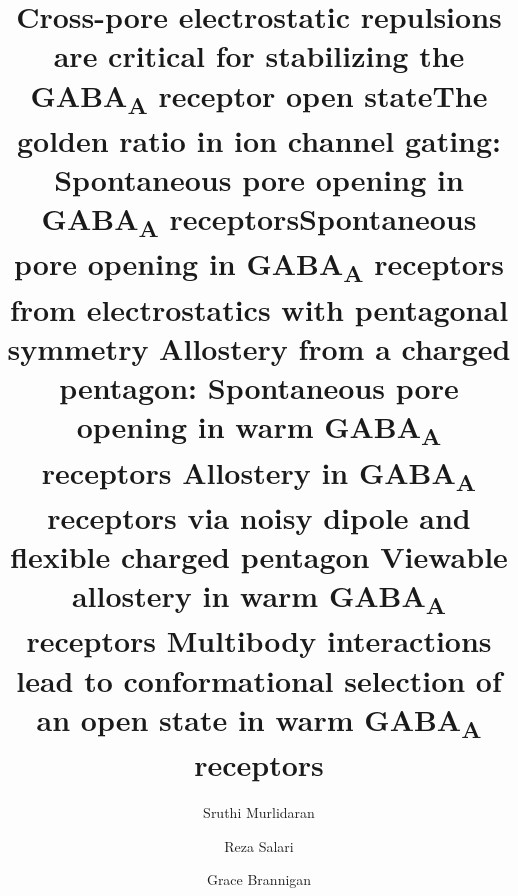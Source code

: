 \documentclass[9pt,twocolumn,twoside,lineno]{pnas-new}
\begin{document}
\title{Cross-pore electrostatic repulsions are critical for stabilizing the GABA\textsubscript{A} receptor open state}
\title{The golden ratio in ion channel gating: Spontaneous pore opening in GABA\textsubscript{A} receptors}
\title{Spontaneous pore opening in GABA\textsubscript{A} receptors from electrostatics with pentagonal symmetry }
\title{Allostery from a charged pentagon: Spontaneous pore opening in warm GABA\textsubscript{A} receptors  }
\title{Allostery in GABA\textsubscript{A} receptors via noisy dipole and flexible charged pentagon  }
\title{Viewable allostery in warm GABA\textsubscript{A} receptors }
\title{Multibody interactions lead to conformational selection of an open state in warm GABA\textsubscript{A} receptors }
\author[a,1]{Sruthi Murlidaran}
\author[a,b,2]{Reza Salari}
\author[a,b,3]{Grace Brannigan}


\newcommand{\SFullABF}{S14}
\newcommand{\sfigAlignment}{S3}
\newcommand{\sfigDeltaPhiDist}{S2}
\newcommand{\SklowTrepTwo}{S6}
\newcommand{\SkMovie}{S1}
\newcommand{\sFigEnergy}{S1}
\newcommand{\sFigReplicas}{S5-S11}
\newcommand{\grace}[1]{\textcolor{blue}{#1}}
\newcommand{\GABAA}{GABA\textsubscript{A}R\xspace}
\newcommand{\avgr}{\bar{r}}
\newcommand{\varr}{\delta r^{2}}
\newcommand{\plgics}{pLGICs}
\newcommand{\plgic}{pLGIC~}
\newcommand{\nachr}{nAChR~}
\newcommand{\fivering}{interfacial band~}
\newcommand{\fiveringnos}{interfacial band}
\newcommand{\triad}{pore oscillator~}
\newcommand{\triadns}{pore oscillator}
\newcommand{\extended}{elongated~}
\newcommand{\flip}{flip~}
\newcommand{\muthotmovie}{2}
\end{document}
